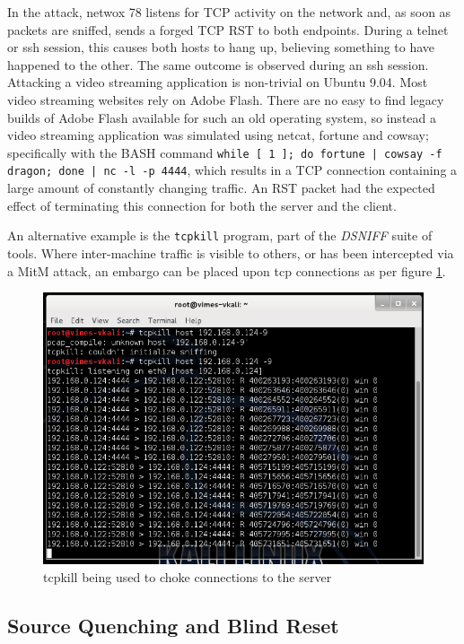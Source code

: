 In the attack, netwox 78 listens for TCP activity on the network and, as soon as packets are sniffed, sends a forged TCP
RST to both endpoints. During a telnet or ssh session, this causes both hosts to hang up, believing something to have
happened to the other. The same outcome is observed during an ssh session. Attacking a video streaming application is
non-trivial on Ubuntu 9.04. Most video streaming websites rely on Adobe Flash. There are no easy to find legacy builds
of Adobe Flash available for such an old operating system, so instead a video streaming application was simulated using
netcat, fortune and cowsay; specifically with the BASH command {\tt while [ 1 ]; do fortune | cowsay -f dragon; done |
nc -l -p 4444}, which results in a TCP connection containing a large amount of constantly changing traffic. An RST
packet had the expected effect of terminating this connection for both the server and the client.

An alternative example is the {\tt tcpkill} program, part of the \emph{DSNIFF} suite of tools. Where inter-machine
traffic is visible to others, or has been intercepted via a MitM attack, an embargo can be placed upon tcp connections as
per figure \ref{fig:tcpkill}.

\begin{figure}[h]
    \centering
    \includegraphics[width=.5\linewidth]{images/tcpkill.png}
    \caption{tcpkill being used to choke connections to the server}
    \label{fig:tcpkill}
\end{figure}

\subsection{Source Quenching and Blind Reset}

